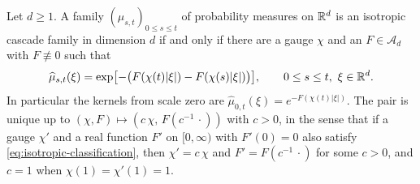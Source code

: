 \begin{theorem}\label{thm:isotropic-classification}
Let $d \ge 1$. A family $(\mu_{s,t})_{0 \le s \le t}$ of probability measures on $\mathbb{R}^d$ is an
isotropic cascade family in dimension $d$ if and only if there are a gauge $\chi$ and an
$F \in \mathcal{A}_d$ with $F \not\equiv 0$ such that
\begin{equation}\label{eq:isotropic-classification}
  \widehat\mu_{s,t}(\xi) = \exp\bigl[-\bigl(F(\chi(t)|\xi|) - F(\chi(s)|\xi|)\bigr)\bigr],
  \qquad 0 \le s \le t,\ \xi \in \mathbb{R}^d .
\end{equation}
In particular the kernels from scale zero are $\widehat\mu_{0,t}(\xi) = e^{-F(\chi(t)|\xi|)}$. The
pair is unique up to $(\chi,F) \mapsto (c\,\chi,\,F(c^{-1}\,\cdot))$ with $c > 0$, in the sense that if a gauge $\chi'$
and a real function $F'$ on $[0,\infty)$ with $F'(0) = 0$ also satisfy
\ref{eq:isotropic-classification}, then
$\chi' = c\,\chi$ and $F' = F(c^{-1}\,\cdot)$ for some $c > 0$, and $c = 1$ when
$\chi(1) = \chi'(1) = 1$.
\end{theorem}

